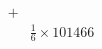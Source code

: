 \documentclass[preview]{standalone}
\begin{document}
\begin{align*}
+&\\&\frac{1}{6}\times101466
\end{align*}
\end{document}
